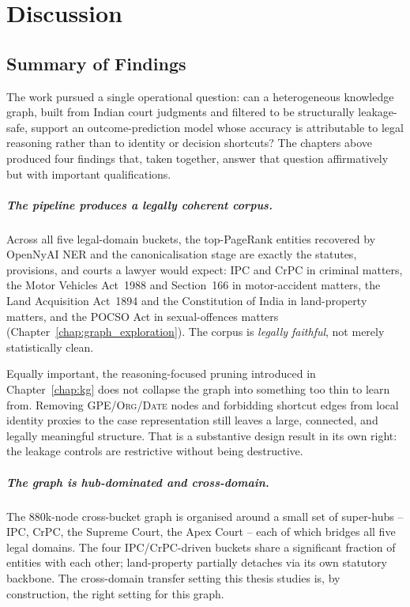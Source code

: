 \chapter{Discussion}
\label{chap:discussion}

\section{Summary of Findings}

The work pursued a single operational question: can a heterogeneous
knowledge graph, built from Indian court judgments and filtered to be
structurally leakage-safe, support an outcome-prediction model whose
accuracy is attributable to legal reasoning rather than to identity or
decision shortcuts? The chapters above produced four findings that,
taken together, answer that question affirmatively but with
important qualifications.

\paragraph{The pipeline produces a legally coherent corpus.} Across all
five legal-domain buckets, the top-PageRank entities recovered by
OpenNyAI NER and the canonicalisation stage are exactly the statutes,
provisions, and courts a lawyer would expect: IPC and CrPC in criminal
matters, the Motor Vehicles Act~1988 and Section~166 in motor-accident
matters, the Land Acquisition Act~1894 and the Constitution of India
in land-property matters, and the POCSO Act in sexual-offences matters
(Chapter~\ref{chap:graph_exploration}). The corpus is
\emph{legally faithful}, not merely statistically clean.

{Equally important, the reasoning-focused pruning introduced
in Chapter~\ref{chap:kg} does not collapse the graph into something too
thin to learn from. Removing \textsc{GPE}/\textsc{Org}/\textsc{Date}
nodes and forbidding shortcut edges from local identity proxies to the
case representation still leaves a large, connected, and legally
meaningful structure. That is a substantive design result in its own
right: the leakage controls are restrictive without being destructive.\par}

\paragraph{The graph is hub-dominated and cross-domain.} The $880$k-node
cross-bucket graph is organised around a small set of super-hubs --
IPC, CrPC, the Supreme Court, the Apex Court -- each of which bridges
all five legal domains. The four IPC/CrPC-driven buckets share a
significant fraction of entities with each other; land-property
partially detaches via its own statutory backbone. The cross-domain
transfer setting this thesis studies is, by construction, the right
setting for this graph.

